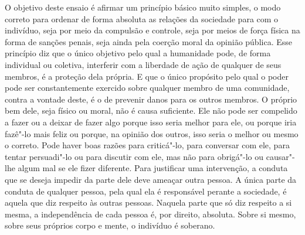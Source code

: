 O objetivo deste ensaio é afirmar um princípio básico muito simples, o
modo correto para ordenar de forma absoluta as relações da sociedade para
com o indivíduo, seja por meio da compulsão e controle, seja por meios
de força física na forma de sanções penais, seja ainda pela coerção moral
da opinião pública. Esse princípio diz que o único objetivo  pelo
qual a humanidade pode, de forma individual ou coletiva, interferir
com a liberdade de ação de qualquer de seus membros, é a proteção dela
própria. E que o único propósito pelo qual o poder pode ser
constantemente exercido sobre qualquer membro de uma comunidade, contra a
vontade deste, é o de prevenir danos para os outros membros. O próprio
bem dele, seja físico ou moral, não é causa suficiente. Ele não pode
ser compelido a fazer ou a deixar de fazer algo porque isso seria
melhor para ele, ou porque iria fazê"-lo mais feliz ou porque, na
opinião dos outros, isso seria o melhor ou mesmo o correto. Pode haver
boas razões para criticá"-lo, para conversar com ele, para tentar
persuadi"-lo ou para discutir com ele, mas não para obrigá"-lo 
ou causar"-lhe algum mal se ele fizer diferente. Para justificar uma
intervenção, a conduta que se deseja impedir da parte dele deve 
ameaçar outra pessoa. A única parte da conduta de
qualquer pessoa,  pela qual ela é responsável perante a sociedade, é
aquela que diz respeito às outras pessoas. Naquela parte que só diz
respeito a si mesma, a independência de cada pessoa é, por direito,
absoluta. Sobre si mesmo, sobre seus próprios corpo e mente, o
indivíduo é soberano. 

